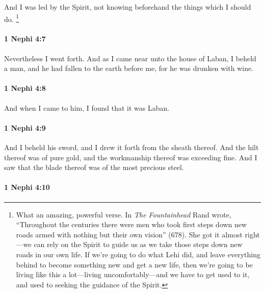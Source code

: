 			And I was led by the Spirit,
			not knowing beforehand the things which I should do.%
				\footnote{%
					\label{1NEPHI-4-6-NOTE-spirit}%
					What an amazing, powerful verse. In \textit{The Fountainhead} Rand wrote, ``Throughout the centuries there were men who took first steps down new roads armed with nothing but their own vision'' (678). She got it almost right---we can rely on the Spirit to guide us as we take those steps down new roads in our own life. If we're going to do what Lehi did, and leave everything behind to become something new and get a new life, then we're going to be living like this a lot---living uncomfortably---and we have to get used to it, and used to seeking the guidance of the Spirit.
					}

		\paragraph{1 Nephi 4:7} %
			\label{1NEPHI-4-7}

			Nevertheless I went forth.
			And as I came near unto the house of Laban, I beheld a man,
			and he had fallen to the earth before me,
			for he was drunken with wine.

		\paragraph{1 Nephi 4:8} %
			\label{1NEPHI-4-8}

			And when I came to him, I found that it was Laban.

		\paragraph{1 Nephi 4:9} %
			\label{1NEPHI-4-9}

			And I beheld his sword, and I drew it forth from the sheath thereof.
			And the hilt thereof was of pure gold,
			and the workmanship thereof was exceeding fine.
			And I saw that the blade thereof was of the most precious steel.

		\paragraph{1 Nephi 4:10} %
			\label{1NEPHI-4-10}

